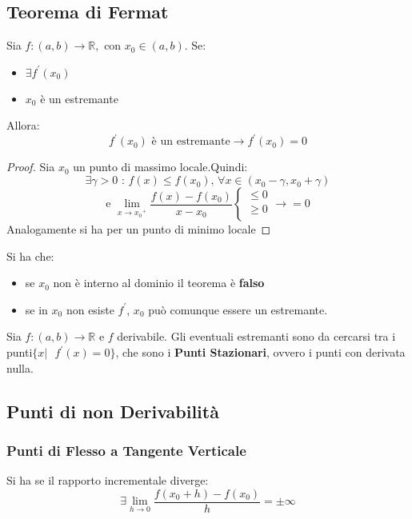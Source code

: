 \documentclass[a4paper,12pt, oneside]{book}
\begin{document}
\subsection{Teorema di Fermat}
\begin{teorema}[di Fermat]
	Sia $f:(a,b)\rightarrow \mathbb{R}, \mbox{ con } x_0\in (a,b)$. Se:
	\begin{itemize}
		\item $\exists f^{'}(x_0)$
		\item $x_0$ è un estremante
	\end{itemize}
	Allora: $$f^{'}(x_0) \mbox{ è un estremante}\rightarrow f^{'}(x_0)=0$$
\end{teorema}
\begin{proof}
	Sia $x_0$ un punto di massimo locale.Quindi: $$\exists\gamma>0 \mbox{ : } f(x)\leq f(x_0) \mbox{, } \forall x\in (x_0-\gamma, x_0+\gamma)$$
	$$\mbox{e }\lim_{x\rightarrow {x_0}^{+}}\frac{f(x)-f(x_0)}{x-x_0}\left\{
		\begin{array}{ll}
			\leq0 \\
			\geq0 \\
		\end{array}
		\right.\longrightarrow =0$$
	Analogamente si ha per un punto di minimo locale
\end{proof}
\begin{shaded}
	\begin{osservazione}
		Si ha che:
		\begin{itemize}
			\item se $x_0$ non è interno al dominio il teorema è \textbf{falso}
			\item se in $x_0$ non esiste $f^{'}$, $x_0$ può comunque essere un estremante.
		\end{itemize}
	\end{osservazione}
	\begin{osservazione}
		Sia $f:(a,b)\rightarrow\mathbb{R} \mbox{ e } f$ derivabile. Gli eventuali estremanti sono da cercarsi tra i punti$\{x|\mbox{ }f^{'}(x)=0\}$, che sono i \textbf{Punti Stazionari}, ovvero i punti con derivata nulla.
	\end{osservazione}
\end{shaded}
\subsection{Punti di non Derivabilità}
\subsubsection{Punti di Flesso a Tangente Verticale}
Si ha se il rapporto incrementale diverge:
$$\exists\lim_{h\rightarrow 0} \frac{f(x_0+h)-f(x_0)}{h}=\pm\infty$$
\end{document}
